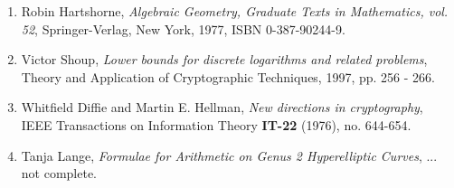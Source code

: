 



\begin{enumerate}[1]

	\item \label{Hartshorne} Robin Hartshorne, \textit{Algebraic Geometry, Graduate Texts in Mathematics, vol. 52}, Springer-Verlag, New York, 1977, ISBN 0-387-90244-9.   
	
	\item \label{VictorShoup} Victor Shoup, \textit{Lower bounds for discrete logarithms and related problems}, Theory and Application of Cryptographic Techniques, 1997, pp. 256 - 266. 
	
	\item \label{WhitfieldDiffieMartinHellman} Whitfield Diffie and Martin E. Hellman, \textit{New directions in cryptography}, IEEE Transactions on Information Theory \textbf{IT-22} (1976), no. 644-654.  

	\item \label{TanjaLange} Tanja Lange, \textit{Formulae for Arithmetic on Genus 2 Hyperelliptic Curves}, ... not complete.
\end{enumerate}